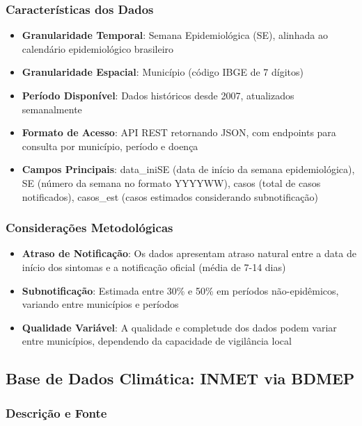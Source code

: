 \subsubsection{Características dos Dados}

\begin{itemize}
    \item \textbf{Granularidade Temporal}: Semana Epidemiológica (SE), alinhada ao calendário epidemiológico brasileiro
    \item \textbf{Granularidade Espacial}: Município (código IBGE de 7 dígitos)
    \item \textbf{Período Disponível}: Dados históricos desde 2007, atualizados semanalmente
    \item \textbf{Formato de Acesso}: API REST retornando JSON, com endpoints para consulta por município, período e doença
    \item \textbf{Campos Principais}: data\_iniSE (data de início da semana epidemiológica), SE (número da semana no formato YYYYWW), casos (total de casos notificados), casos\_est (casos estimados considerando subnotificação)
\end{itemize}

\subsubsection{Considerações Metodológicas}

\begin{itemize}
    \item \textbf{Atraso de Notificação}: Os dados apresentam atraso natural entre a data de início dos sintomas e a notificação oficial (média de 7-14 dias)
    \item \textbf{Subnotificação}: Estimada entre 30\% e 50\% em períodos não-epidêmicos, variando entre municípios e períodos
    \item \textbf{Qualidade Variável}: A qualidade e completude dos dados podem variar entre municípios, dependendo da capacidade de vigilância local
\end{itemize}

\subsection{Base de Dados Climática: INMET via BDMEP}

\subsubsection{Descrição e Fonte}

